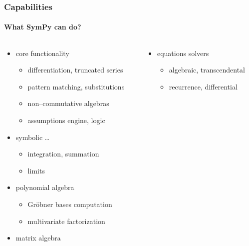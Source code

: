 \documentclass{beamer}
\begin{document}
\begin{frame}[fragile]
    \frametitle{Capabilities}
    \framesubtitle{What SymPy can do?}

    \begin{columns}
        \begin{column}[l]{0.5\textwidth}
            \begin{itemize}
                \item core functionality
                    \begin{itemize}
                        \item differentiation, truncated series
                        \item pattern matching, substitutions
                        \item non--commutative algebras
                        \item assumptions engine, logic
                    \end{itemize}
                \item symbolic \ldots
                    \begin{itemize}
                        \item integration, summation
                        \item limits
                    \end{itemize}
                \item polynomial algebra
                    \begin{itemize}
                        \item Gröbner bases computation
                        \item multivariate factorization
                    \end{itemize}
                \item matrix algebra
            \end{itemize}
        \end{column}
        \begin{column}[r]{0.5\textwidth}
            \begin{itemize}
                \item equations solvers
                    \begin{itemize}
                        \item algebraic, transcendental
                        \item recurrence, differential
                    \end{itemize}

\end{itemize}
\end{column}
\end{columns}
\end{frame}
\end{document}

